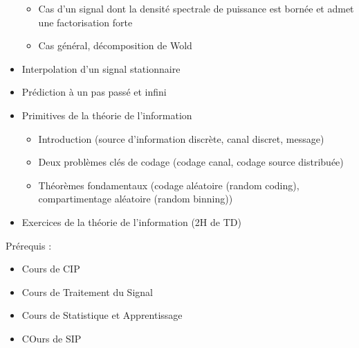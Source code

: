 \begin{itemize}
\begin{itemize}
        \item Cas d'un signal dont la densité spectrale de puissance est bornée et admet une factorisation forte
        \item Cas général, décomposition de Wold
    \end{itemize}
    \item Interpolation d'un signal stationnaire
    \item Prédiction à un pas passé et infini
    \item Primitives de la théorie de l'information
    \begin{itemize}
        \item Introduction (source d'information discrète, canal discret, message)
        \item Deux problèmes clés de codage (codage canal, codage source distribuée)
        \item Théorèmes fondamentaux (codage aléatoire (random coding), compartimentage aléatoire (random binning))
    \end{itemize}
    \item Exercices de la théorie de l'information (2H de TD) \newline
\end{itemize}
\newpage
\noindent Prérequis : \newline
\begin{itemize}
    \item Cours de CIP
    \item Cours de Traitement du Signal
    \item Cours de Statistique et Apprentissage
    \item COurs de SIP
\end{itemize}